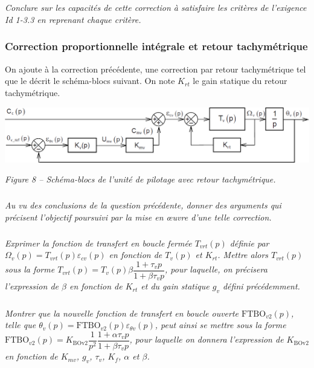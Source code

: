 \documentclass[10pt,fleqn]{article} %
\begin{document}
\subparagraph{}
\textit{Conclure sur les capacités de cette correction à satisfaire les critères de l'exigence Id 1-3.3 en
reprenant chaque critère.}
\ifprof
\begin{corrige}
\end{corrige}
\else
\fi



\subsubsection*{Correction proportionnelle intégrale et retour tachymétrique}

On ajoute à la correction précédente, une correction par retour tachymétrique tel que le décrit le
schéma-blocs suivant. On note $K_{rt}$ le gain statique du retour tachymétrique.


\begin{center}
\includegraphics[width=\linewidth]{images/fig_20}

\textit{Figure 8 -- Schéma-blocs de l'unité de pilotage avec retour tachymétrique.}
\end{center}



\subparagraph{}
\textit{Au vu des conclusions de la question précédente, donner des arguments qui précisent l'objectif
poursuivi par la mise en \oe{}uvre d'une telle correction.}
\ifprof
\begin{corrige}
\end{corrige}
\else
\fi


\subparagraph{}
\textit{Exprimer la fonction de transfert en boucle fermée $T_{vrt}(p)$ définie par $\Omega_v(p)=T_{vrt}(p)\varepsilon_{cv}(p)$ en fonction de $T_v (p)$ et $K_{rt}$. Mettre alors $T_{vrt}(p)$ sous la forme $T_{vrt}(p)=T_v(p)\beta\dfrac{1+\tau_v p}{1+\beta \tau_v p}$, pour laquelle, on précisera l'expression de $\beta$ en fonction de $K_{rt}$ et du gain statique $g_v$ défini précédemment.}
\ifprof
\begin{corrige}
\end{corrige}
\else
\fi


\subparagraph{}
\textit{Montrer que la nouvelle fonction de transfert en boucle ouverte $\text{FTBO}_{v2}(p)$, telle que
$\theta_v(p)=\text{FTBO}_{v2}(p)\varepsilon_{\theta v}(p)$, peut ainsi se mettre sous la forme $\text{FTBO}_{v2}(p)=K_{\text{BOv2}}\dfrac{1}{p^2}\dfrac{1+\alpha \tau_v p}{1+\beta \tau_v p}$,  pour laquelle on donnera l'expression de $K_{\text{BOv2}}$ en fonction de $K_{mv}$, $g_v$, $\tau_v$, $K_f$, $\alpha$ et $\beta$.}
\end{document}
